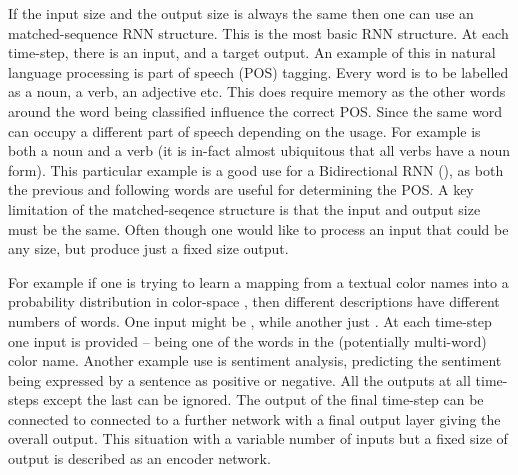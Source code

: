 \documentclass[12pt,parskip]{komatufte}
\begin{document}
If the input size and the output size is always the same then one can use an matched-sequence RNN structure.
This is the most basic RNN structure.
At each time-step, there is an input, and a target output.
An example of this in natural language processing is part of speech (POS) tagging.
Every word is to be labelled as a noun, a verb, an adjective etc.
This does require memory as the other words around the word being classified influence the correct POS.
Since the same word can occupy a different part of speech depending on the usage.
For example  is both a noun and a verb (it is in-fact almost ubiquitous that all verbs have a noun form).
This particular example is a good use for a Bidirectional RNN (), as both the previous and following words are useful for determining the POS.
A key limitation of the matched-seqence structure is that the input and output size must be the same.
Often though one would like to process an input that could be any size, but produce just a fixed size output.



For example if one is trying to learn a mapping from a textual color names into a probability distribution in color-space , then different descriptions have different numbers of words.
One input might be , while another just .
At each time-step one input is provided -- being one of the words in the (potentially multi-word) color name.
Another example use is sentiment analysis, predicting the sentiment being expressed by a sentence as positive or negative.
All the outputs at all time-steps except the last can be ignored.
The output of the final time-step can be connected to connected to a further network with a final output layer giving the overall output.
This situation with a variable number of inputs but a fixed size of output is described as an encoder network.

\end{document}
